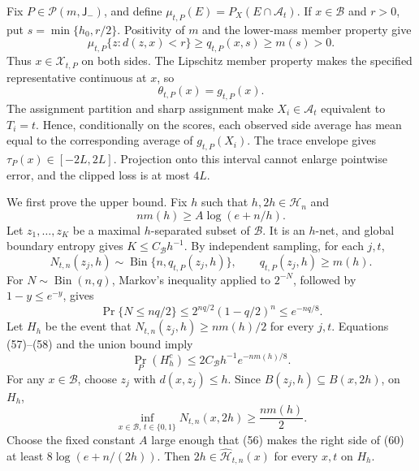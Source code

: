 Fix \(P\in\mathcal P(m,\mathsf J_{-})\), and define \(\mu_{t,P}(E)=P_X(E\cap\mathcal A_t)\). If \(x\in\mathcal B\) and \(r>0\), put \(s=\min\{h_0,r/2\}\). Positivity of \(m\) and the lower-mass member property give
\[
 \mu_{t,P}\{z:d(z,x)<r\}
 \ge q_{t,P}(x,s)
 \ge m(s)>0. \tag{54}
\]
Thus \(x\in\mathcal X_{t,P}\) on both sides. The Lipschitz member property makes the specified representative continuous at \(x\), so
\[
 \theta_{t,P}(x)=g_{t,P}(x). \tag{55}
\]
The assignment partition and sharp assignment make \(X_i\in\mathcal A_t\) equivalent to \(T_i=t\). Hence, conditionally on the scores, each observed side average has mean equal to the corresponding average of \(g_{t,P}(X_i)\). The trace envelope gives \(\tau_P(x)\in[-2L,2L]\). Projection onto this interval cannot enlarge pointwise error, and the clipped loss is at most \(4L\).

We first prove the upper bound. Fix \(h\) such that \(h,2h\in\mathcal H_n\) and
\[
 nm(h)\ge A\log(e+n/h). \tag{56}
\]
Let \(z_1,\ldots,z_K\) be a maximal \(h\)-separated subset of \(\mathcal B\). It is an \(h\)-net, and global boundary entropy gives \(K\le C_{\mathcal B}h^{-1}\). By independent sampling, for each \(j,t\),
\[
 N_{t,n}(z_j,h)\sim\operatorname{Bin}\{n,q_{t,P}(z_j,h)\},
 \qquad q_{t,P}(z_j,h)\ge m(h). \tag{57}
\]
For \(N\sim\operatorname{Bin}(n,q)\), Markov's inequality applied to \(2^{-N}\), followed by \(1-y\le e^{-y}\), gives
\[
 \Pr\{N\le nq/2\}
 \le2^{nq/2}(1-q/2)^n
 \le e^{-nq/8}. \tag{58}
\]
Let \(H_h\) be the event that \(N_{t,n}(z_j,h)\ge nm(h)/2\) for every \(j,t\). Equations (57)--(58) and the union bound imply
\[
 \Pr_P(H_h^c)\le2C_{\mathcal B}h^{-1}e^{-nm(h)/8}. \tag{59}
\]
For any \(x\in\mathcal B\), choose \(z_j\) with \(d(x,z_j)\le h\). Since \(B(z_j,h)\subseteq B(x,2h)\), on \(H_h\),
\[
 \inf_{x\in\mathcal B,\,t\in\{0,1\}}N_{t,n}(x,2h)
 \ge\frac{nm(h)}2. \tag{60}
\]
Choose the fixed constant \(A\) large enough that (56) makes the right side of (60) at least \(8\log(e+n/(2h))\). Then \(2h\in\widehat{\mathcal H}_{t,n}(x)\) for every \(x,t\) on \(H_h\).

